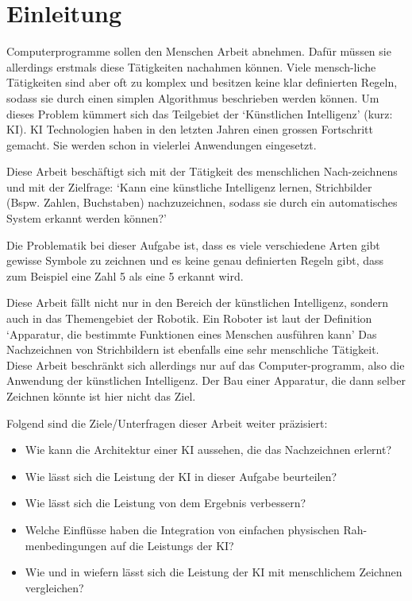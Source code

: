 \chapter{Einleitung}
Computerprogramme sollen den Menschen Arbeit abnehmen. Dafür müssen sie
allerdings erstmals diese Tätigkeiten nachahmen können. Viele mensch\hyp{}liche
Tätigkeiten sind aber oft zu komplex und besitzen keine klar definierten Regeln,
sodass sie durch einen simplen Algorithmus beschrieben werden können. Um dieses
Problem kümmert sich das Teilgebiet der `Künstlichen Intelligenz' (kurz: KI). KI
Technologien haben in den letzten Jahren einen grossen Fortschritt gemacht. Sie
werden schon in vielerlei Anwendungen eingesetzt.

Diese Arbeit beschäftigt sich mit der Tätigkeit des menschlichen Nach\hyp{}zeichnens
und mit der Zielfrage: `Kann eine künstliche Intelligenz lernen, Strichbilder
(Bspw. Zahlen, Buchstaben) nachzuzeichnen, sodass sie durch ein automatisches
System erkannt werden können?'

Die Problematik bei dieser Aufgabe ist, dass es viele verschiedene Arten gibt
gewisse Symbole zu zeichnen und es keine genau definierten Regeln gibt, dass zum
Beispiel eine Zahl 5 als eine 5 erkannt wird.

Diese Arbeit fällt nicht nur in den Bereich der künstlichen Intelligenz, sondern
auch in das Themengebiet der Robotik. Ein Roboter ist laut der Definition
`Apparatur, die bestimmte Funktionen eines Menschen ausführen kann'
\cite{noauthor_duden_nodate-1} Das Nachzeichnen von Strichbildern ist ebenfalls
eine sehr menschliche Tätigkeit. Diese Arbeit beschränkt sich allerdings nur auf
das Computer\hyp{}programm, also die Anwendung der künstlichen Intelligenz. Der Bau
einer Apparatur, die dann selber Zeichnen könnte ist hier nicht das Ziel.

Folgend sind die Ziele/Unterfragen dieser Arbeit weiter präzisiert:
\begin{itemize}
    \item Wie kann die Architektur einer KI aussehen, die das Nachzeichnen
    erlernt?
    \item Wie lässt sich die Leistung der KI in dieser Aufgabe beurteilen?
    \item Wie lässt sich die Leistung von dem Ergebnis verbessern?
    \item Welche Einflüsse haben die Integration von einfachen physischen
    Rah\hyp{}menbedingungen auf die Leistungs der KI?
    \item Wie und in wiefern lässt sich die Leistung der KI mit menschlichem
    Zeichnen vergleichen?
\end{itemize}
